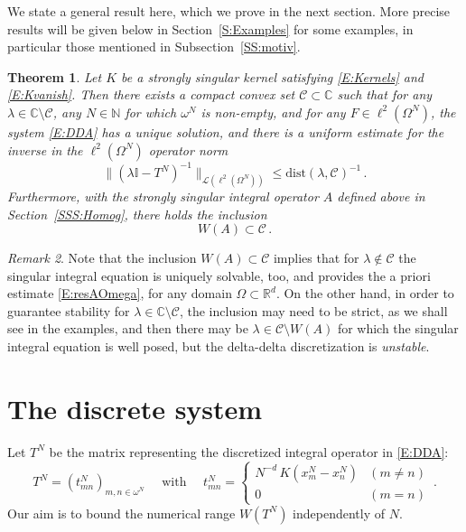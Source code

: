 \documentclass[12pt]{amsart}
\newtheorem{theorem}{Theorem}[section]
\theoremstyle{definition}
\theoremstyle{remark}
\newtheorem{remark}[theorem]{Remark}
\numberwithin{equation}{section}
\newcommand\C{{\mathbb C}}
\newcommand\R{{\mathbb R}}
\newcommand\N{{\mathbb N}}
\newcommand\cC{{\mathcal{C}}}
\newcommand\cL{{\mathcal{L}}}
\newcommand {\Id}{\mathbb I}
\newcommand{\dist}{\mathrm{dist}}
\begin{document}
We state a general result here, which we prove in the next section. More precise results will be given below in Section~\ref{S:Examples} for some examples, in particular those mentioned in Subsection~\ref{SS:motiv}.
\begin{theorem}
 \label{T:stabgeneral}
Let $K$ be a strongly singular kernel satisfying \eqref{E:Kernels} and \eqref{E:Kvanish}. Then there exists a compact convex set $\cC\subset\C$ such that for any $\lambda\in\C\setminus\cC$, any $N\in\N$ for which $\omega^{N}$ is non-empty, and for any $F\in\ell^{2}(\Omega^{N})$, the system \eqref{E:DDA} has a unique solution, and there is a uniform estimate for the inverse in the $\ell^{2}(\Omega^{N})$ operator norm
\begin{equation}
\label{E:resTN}
 \|(\lambda\Id-T^{N})^{-1}\|_{\cL(\ell^{2}(\Omega^{N}))} \le \dist(\lambda,\cC)^{-1}\,.
\end{equation}
Furthermore, with the strongly singular integral operator $A$ defined above in Section~\ref{SSS:Homog}, there holds the inclusion
\begin{equation}
\label{E:WAsubsetC}
  W(A) \subset \cC\,.
\end{equation}
\end{theorem}
\begin{remark}
 \label{R:overshoot}
Note that the inclusion $W(A) \subset \cC$ implies that for $\lambda\not\in\cC$ the singular integral equation is uniquely solvable, too, and provides the a priori estimate \eqref{E:resAOmega}, for any domain $\Omega\subset\R^{d}$. On the other hand, in order to guarantee stability for $\lambda\in\C\setminus\cC$, the inclusion may need to be strict, as we shall see in the examples, and then there may be $\lambda\in\cC\setminus W(A)$ for which the singular integral equation is well posed, but the delta-delta discretization is \emph{unstable}.
\end{remark}



\section{The discrete system}\label{S:discrete}
Let $T^{N}$ be the matrix representing the discretized integral operator in \eqref{E:DDA}:
\begin{equation}
\label{E:TN}
T^{N} = (t^{N}_{mn})_{m,n\in\omega^{N}}
\quad\mbox{ with }\quad
 t^{N}_{mn} = \begin{cases}
                N^{-d}\, K(x^{N}_{m}-x^{N}_{n}) &(m\ne n)\\
                0 &(m=n)
 				\end{cases}
\,.
\end{equation}
Our aim is to bound the numerical range $W(T^{N})$ independently of $N$.
\end{document}
